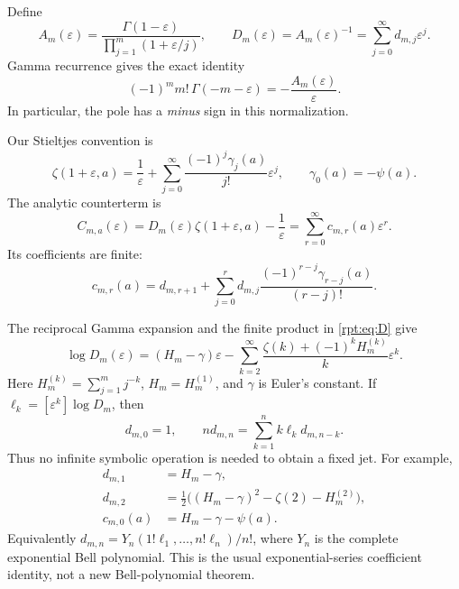 \documentclass[11pt,a4paper]{article}
\numberwithin{equation}{section}
\theoremstyle{definition}\newtheorem{definition}[theorem]{Definition}
\theoremstyle{remark}\newtheorem{remark}[theorem]{Remark}
\newcommand{\eps}{\varepsilon}
\newcommand{\coef}[2]{[#1^{#2}]}
\begin{document}
Define
\begin{equation}
A_m(\eps)=\frac{\Gamma(1-\eps)}{\prod_{j=1}^m(1+\eps/j)},
\qquad
D_m(\eps)=A_m(\eps)^{-1}=\sum_{j=0}^{\infty}d_{m,j}\eps^j.
\label{rpt:eq:D}
\end{equation}
Gamma recurrence gives the exact identity
\begin{equation}
(-1)^m m!\,\Gamma(-m-\eps)=-\frac{A_m(\eps)}{\eps}.
\label{rpt:eq:gamma}
\end{equation}
In particular, the pole has a \emph{minus} sign in this normalization.

Our Stieltjes convention is
\begin{equation}
\zeta(1+\eps,a)=\frac1\eps+
\sum_{j=0}^{\infty}\frac{(-1)^j\gamma_j(a)}{j!}\eps^j,
\qquad \gamma_0(a)=-\psi(a).
\label{rpt:eq:stieltjes}
\end{equation}
The analytic counterterm is
\begin{equation}
C_{m,a}(\eps)=D_m(\eps)\zeta(1+\eps,a)-\frac1\eps
=\sum_{r=0}^{\infty}c_{m,r}(a)\eps^r.
\label{rpt:eq:C}
\end{equation}
Its coefficients are finite:
\begin{equation}
c_{m,r}(a)=d_{m,r+1}+
\sum_{j=0}^r d_{m,j}\frac{(-1)^{r-j}\gamma_{r-j}(a)}{(r-j)!}.
\label{rpt:eq:cfinite}
\end{equation}

The reciprocal Gamma expansion and the finite product in \eqref{rpt:eq:D} give
\begin{equation}
\log D_m(\eps)=(H_m-\gamma)\eps
-\sum_{k=2}^{\infty}\frac{\zeta(k)+(-1)^kH_m^{(k)}}{k}\eps^k.
\label{rpt:eq:logD}
\end{equation}
Here $H_m^{(k)}=\sum_{j=1}^m j^{-k}$, $H_m=H_m^{(1)}$, and $\gamma$ is Euler's constant. If $\ell_k=\coef{\eps}{k}\log D_m$, then
\begin{equation}
d_{m,0}=1,\qquad
n d_{m,n}=\sum_{k=1}^n k\ell_k d_{m,n-k}.
\label{rpt:eq:Drec}
\end{equation}
Thus no infinite symbolic operation is needed to obtain a fixed jet. For example,
\begin{align}
d_{m,1}&=H_m-\gamma,\\
d_{m,2}&=\tfrac12\bigl((H_m-\gamma)^2-\zeta(2)-H_m^{(2)}\bigr),\\
c_{m,0}(a)&=H_m-\gamma-\psi(a).
\end{align}
Equivalently $d_{m,n}=Y_n(1!\ell_1,\ldots,n!\ell_n)/n!$, where $Y_n$ is the complete exponential Bell polynomial. This is the usual exponential-series coefficient identity, not a new Bell-polynomial theorem.
\end{document}
